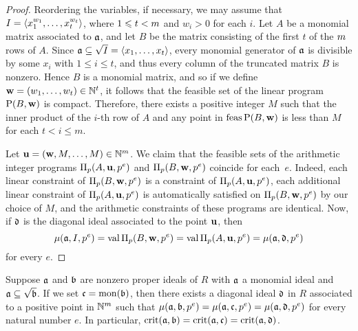 \documentclass{amsart}
\begin{document}
\begin{proof}
   Reordering the variables, if necessary, we may assume that $I = \langle x_1^{w_1}, \ldots, x_t^{w_t} \rangle$, where $1 \leqslant t < m$ and $w_i > 0$ for each $i$.
   Let $A$ be a monomial matrix associated to $\mathfrak{a}$, and let $B$ be the matrix consisting of the first $t$ of the $m$ rows of $A$.
   Since $\mathfrak{a} \subseteq \sqrt I = \langle x_1, \ldots, x_t \rangle$, every monomial generator of $\mathfrak{a}$ is divisible by some $x_i$ with $1 \leq i \leq t$, and thus every column of the truncated matrix $B$ is nonzero.
   Hence $B$ is a monomial matrix, and so if we define $\mathbf{w} = (w_1, \ldots, w_t) \in \mathbb{N}^t$, it follows that the feasible set of the linear program $\mathrm{P}(B, \mathbf{w})$ is compact.
   Therefore, there exists a positive integer $M$ such that the inner product of the $i$-th row of $A$ and any point in $\operatorname{feas} \mathrm{P}(B, \mathbf{w})$ is less than $M$ for each $t < i \leq m$.

   Let $\mathbf{u} = (\mathbf{w},M,\ldots,M)\in \mathbb{N}^m$.
   We claim that the feasible sets of the arithmetic integer programs $\Pi_p(A,\mathbf{u},p^e)$ and $\Pi_p(B,\mathbf{w},p^e)$ coincide for each~$e$.
   Indeed, each linear constraint of $\Pi_p(B, \mathbf{w}, p^e)$ is a constraint of $\Pi_p(A, \mathbf{u},p^e)$, each additional linear constraint of $\Pi_p(A, \mathbf{u},p^e)$ is automatically satisfied on $\Pi_p(B, \mathbf{w},p^e)$ by our choice of $M$, and the arithmetic constraints of these programs are identical.
   Now, if $\mathfrak{d}$ is the diagonal ideal associated to the point $\mathbf{u}$, then
   \[
     \mu(\mathfrak{a}, I, p^e) = \operatorname{val}\Pi_p(B, \mathbf{w}, p^e)  = \operatorname{val} \Pi_p(A, \mathbf{u}, p^e) = \mu(\mathfrak{a}, \mathfrak{d}, p^e)
  \]
  for every $e$.
\end{proof}

\begin{theorem}
   \label{reduce-to-monomial-case: C}
   Suppose $\mathfrak{a}$ and $\mathfrak{b}$ are nonzero proper ideals of
   $R$ with $\mathfrak{a}$ a monomial ideal and $\mathfrak{a} \subseteq \sqrt{\mathfrak{b}}$.
   If we set $\mathfrak{c} = \operatorname{mon}(\mathfrak{b})$,  then there exists a diagonal ideal $\mathfrak{d}$ in
   $R$ associated to a positive point in $\mathbb{N}^m$ such that $\mu(\mathfrak{a}, \mathfrak{b}, p^e) = \mu(\mathfrak{a}, \mathfrak{c}, p^e) = \mu(\mathfrak{a}, \mathfrak{d}, p^e)$ for every natural number $e$.  In particular, $\operatorname{crit}(\mathfrak{a},\mathfrak{b}) = \operatorname{crit}(\mathfrak{a}, \mathfrak{c}) = \operatorname{crit}(\mathfrak{a}, \mathfrak{d})$.
\end{theorem}
\end{document}
